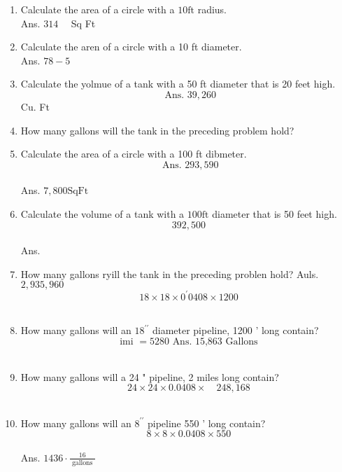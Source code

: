 \documentclass{article}
\begin{document}
\begin{enumerate}
\item Calculate the area of a circle with a $10 \mathrm{ft}$ radius.\\
Ans. $314 \quad$ Sq Ft\\

\item Calculate the aren of a circle with a 10 ft diameter.\\
Ans. $78-5$\\

\item Calculate the yolmue of a tank with a 50 ft diameter that is 20 feet high.\\
$$\text { Ans. } 39,260$$Cu. Ft\\

\item How many gallons will the tank in the preceding problem hold?\\

\item Calculate the area of a circle with a 100 ft dibmeter.\\
$$\text { Ans. } 293,590$$\\
Ans. $7,800 \mathrm{Sq} \mathrm{Ft}$\\

\item Calculate the volume of a tank with a $100 \mathrm{ft}$ diameter that is 50 feet high.\\
$$392,500$$\\
Ans.\\

\item How many gallons ryill the tank in the preceding problen hold? Auls.\\
$2,935,960$\\
$$18 \times 18 \times 0^{\prime} 0408 \times 1200$$\\

\item How many gallons will an $18^{\prime \prime}$ diameter pipeline, 1200 ' long contain?\\
$$\text { imi }=5280 \text { Ans. 15,863 Gallons }$$\\

\item How many gallons will a 24 " pipeline, 2 miles long contain?\\
$$24 \times 24 \times 0.0408 \times \quad 248,168$$\\



\item How many gallons will an $8^{\prime \prime}$ pipeline 550 ' long contain?\\
$$8 \times 8 \times 0.0408 \times 550$$\\
Ans. $1436 \cdot \frac{16}{\text { gallons }}$\\


\end{enumerate}
\end{document}
